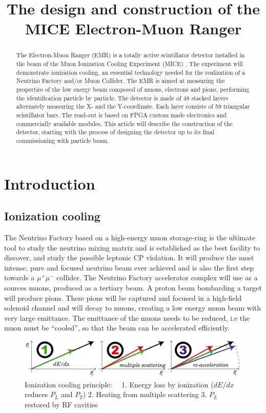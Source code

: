 \documentclass[a4paper,11pt]{article}
\title{The design and construction of the MICE Electron-Muon Ranger}
\author{}
\begin{document}
\maketitle

\begin{abstract}
The Electron-Muon Ranger (EMR) is a totally active scintillator detector installed in the beam of the Muon Ionization
Cooling Experiment (MICE) \cite{MICEweb}. The experiment will demonstrate ionization cooling, an essential technology needed
for the realization of a Neutrino Factory and/or Muon Collider. The EMR is aimed at measuring the properties of the low
energy beam composed of muons, electrons and pions, performing the identification particle by particle. The detector is
made of 48 stacked layers alternately measuring the X- and the Y-coordinate. Each layer consists of 59 triangular
scintillator bars. The read-out is based on FPGA custom made electronics and commercially available modules. This article
will describe the construction of the detector, starting with the process of designing the detector up to its final
commissioning with particle beam.
\end{abstract}

\section{Introduction}
\subsection{Ionization cooling}
The Neutrino Factory based on a high-energy muon storage-ring is the ultimate tool to study the neutrino mixing matrix
and is established as the best facility to discover, and study the possible leptonic CP violation. It will produce the
most intense, pure and focused neutrino beam ever achieved and is also the first step towards a $\mu^+ \mu^-$ collider.
The Neutrino Factory accelerator complex will use as a sources muons, produced as a tertiary beam. A proton beam bombarding
a target will produce pions. These pions will be captured and focused in a high-field solenoid channel and will decay
to muons, creating a low energy muon beam with very large emittance.  The emittance of the muons needs to be reduced,
i.e the muon must be “cooled”, so that the beam can be accelerated efficiently.

\begin{figure}[htb]
 \includegraphics[width=1.\linewidth]{./ICool.png}
 \caption{Ionization cooling principle: \ \ 1. Energy loss by ionization ($dE/dx$ reduces $P_L$ and $P_T$)
    2. Heating from multiple scattering
    3. $P_L$ restored by RF cavities    
   }
 \label{icool}     
\end{figure}
\end{document}
